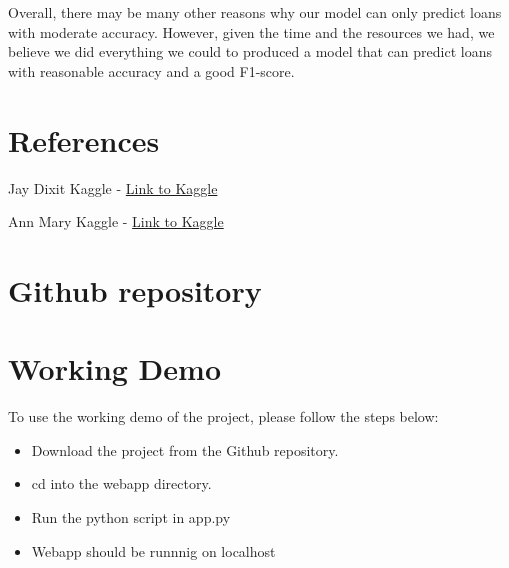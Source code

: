 \documentclass[sigplan]{acmart}
\begin{document}
Overall, there may be many other reasons why our model can only predict loans with moderate accuracy. However, given the time and the resources we had, we believe we did everything we could to produced a model that can predict loans with reasonable accuracy and a good F1-score.

\section{References}
Jay Dixit Kaggle -
\href{https://www.kaggle.com/code/annmary25/loan-status-prediction}{Link to Kaggle}

Ann Mary Kaggle -
\href{https://www.kaggle.com/code/jayrdixit/loan-default-prediction}{Link to Kaggle}


\section{Github repository}


\section{Working Demo}
To use the working demo of the project, please follow the steps below:

\begin{itemize}
    \item Download the project from the Github repository.
    \item cd into the webapp directory.
    \item Run the python script in app.py
    \item Webapp should be runnnig on localhost
\end{itemize}
\end{document}
